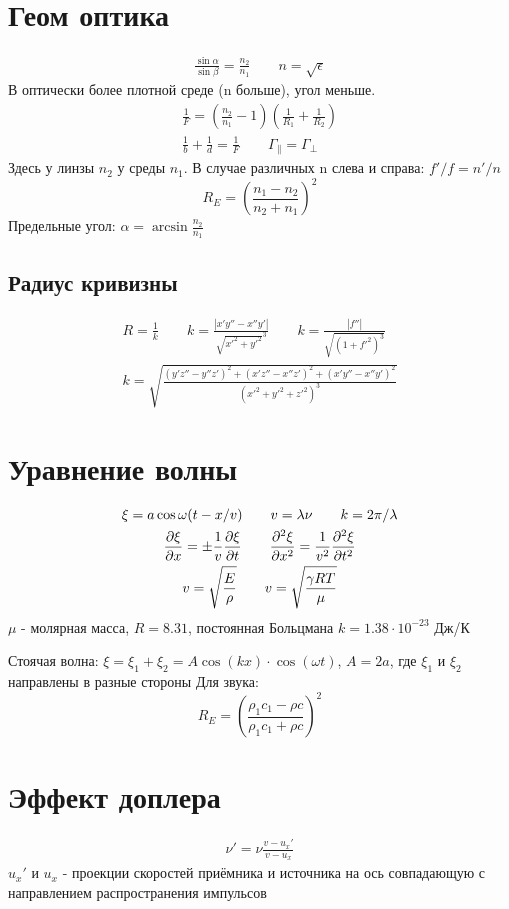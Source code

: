 \documentclass[10pt,twocolumn]{article}
\begin{document}
\section{Геом оптика}
\begin{gather*}
  \frac{\sin \alpha}{\sin \beta}=\frac{n_2}{n_1} \qquad n = \sqrt{\epsilon}
\end{gather*}
В оптически более плотной среде (n больше), угол меньше.
\begin{gather*}
  \frac{1}{F}=(\frac{n_2}{n_1}-1)(\frac{1}{R_1}+\frac{1}{R_2}) \\ \frac{1}{b}+\frac{1}{d}=\frac{1}{F} \qquad \Gamma_{\parallel} = \Gamma_{\perp}
\end{gather*}
Здесь у линзы $n_2$ у среды $n_1$. В случае различных n слева и справа: $f'/f=n'/n$
\[
  R_E=(\frac{n_1-n_2}{n_2+n_1})^2
\]
Предельные угол: $\alpha = \arcsin \frac{n_2}{n_1}$
\subsection{Радиус кривизны}
\begin{gather*}
  R = \frac{1}{k} \qquad k = \frac{|x'y''-x''y'|}{\sqrt{x'^{2}+y'^{2}}^{3}} \qquad k=\frac{|f''|}{\sqrt{(1+f'^{2})^{3}}} \\ 
  k = \sqrt{\frac{(y'z''-y''z')^{2}+(x'z''-x''z')^{2}+(x'y''-x''y')^2}{(x'^{2}+y'^{2}+z'^{2})^{3}}}
\end{gather*}
\section{Уравнение волны}
\begin{gather*}
  \xi = a \cos \omega (t - x/v) \qquad v = \lambda \nu \qquad k=2\pi/\lambda \\ 
  \frac{\partial{\xi}}{\partial{x}}=\pm \frac{1}{v}\frac{\partial{\xi}}{\partial{t}} \qquad \frac{\partial^{2}\xi}{\partial x^{2}}=\frac{1}{v^{2}}\frac{\partial^{2}\xi}{\partial t^{2}} \\ 
  v = \sqrt{\frac{E}{\rho}} \qquad v = \sqrt{\frac{\gamma RT}{\mu}}
\end{gather*}
$\mu$ - молярная масса, $R=8.31$, постоянная Больцмана $k=1.38 \cdot 10^{-23}$ Дж/К

Стоячая волна: $\xi=\xi_1+\xi_2=A\cos (kx) \cdot \cos (\omega t)$, $A = 2a$,
где $\xi_1$ и $\xi_2$ направлены в разные стороны 
Для звука: 
\[
  R_E=(\frac{\rho_1c_1 - \rho c}{\rho_1c_1 + \rho c})^{2}
\]
\section{Эффект доплера}
\begin{gather*}
  \nu'=\nu\frac{v-u_x'}{v-u_x}
\end{gather*}
$u_x'$ и $u_x$ - проекции скоростей приёмника и источника на ось совпадающую
с направлением распространения импульсов
\end{document}

